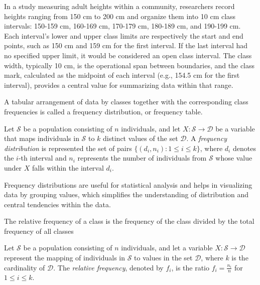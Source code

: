 \begin{example}
In a study measuring adult heights within a community, researchers record heights ranging from 150 cm to 200 cm and organize them into 10 cm class intervals: 150-159 cm, 160-169 cm, 170-179 cm, 180-189 cm, and 190-199 cm. Each interval's lower and upper class limits are respectively the start and end points, such as 150 cm and 159 cm for the first interval. If the last interval had no specified upper limit, it would be considered an open class interval. The class width, typically 10 cm, is the operational span between boundaries, and the class mark, calculated as the midpoint of each interval (e.g., 154.5 cm for the first interval), provides a central value for summarizing data within that range.
\end{example}

A tabular arrangement of data by classes together with the corresponding class frequencies is called a frequency distribution, or frequency table.

\begin{definition}
Let $\mathcal{S}$ be a population consisting of $n$ individuals, and let $X: \mathcal{S} \rightarrow \mathcal{D}$ be a variable that maps individuals in $\mathcal{S}$ to $k$ distinct values of the set $\mathcal{D}$. A \emph{frequency distribution} is represented the set of pairs $\{(d_i, n_i) : 1 \leq i \leq k\}$, where $d_i$ denotes the $i$-th interval and $n_i$ represents the number of individuals from $\mathcal{S}$ whose value under $X$ falls within the interval $d_i$.
\end{definition}

Frequency distributions are useful for statistical analysis and helps in visualizing data by grouping values, which simplifies the understanding of distribution and central tendencies within the data.

The relative frequency of a class is the frequency of the class divided by the total frequency of all classes

\begin{definition}
Let $\mathcal{S}$ be a population consisting of $n$ individuals, and let a variable $X: \mathcal{S} \rightarrow \mathcal{D}$ represent the mapping of individuals in $\mathcal{S}$ to values in the set $\mathcal{D}$, where $k$ is the cardinality of $\mathcal{D}$. The \emph{relative frequency}, denoted by $f_i$, is the ratio $f_i = \frac{n_i}{n}$ for $1 \leq i \leq k$.
\end{definition}

